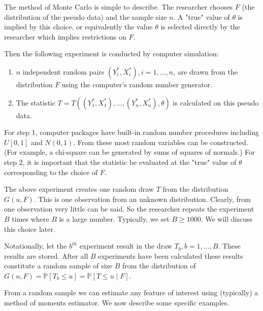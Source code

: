 \documentclass[10pt]{article}
\begin{document}
The method of Monte Carlo is simple to describe. The researcher chooses $F$ (the distribution of the pseudo data) and the sample size $n$. A "true" value of $\theta$ is implied by this choice, or equivalently the value $\theta$ is selected directly by the researcher which implies restrictions on $F$.

Then the following experiment is conducted by computer simulation:

\begin{enumerate}
  \item $n$ independent random pairs $\left(Y_{i}^{*}, X_{i}^{*}\right), i=1, \ldots, n$, are drawn from the distribution $F$ using the computer's random number generator.

  \item The statistic $T=T\left(\left(Y_{1}^{*}, X_{1}^{*}\right), \ldots,\left(Y_{n}^{*}, X_{n}^{*}\right), \theta\right)$ is calculated on this pseudo data.

\end{enumerate}
For step 1, computer packages have built-in random number procedures including $U[0,1]$ and $N(0,1)$. From these most random variables can be constructed. (For example, a chi-square can be generated by sums of squares of normals.) For step 2, it is important that the statistic be evaluated at the "true" value of $\theta$ corresponding to the choice of $F$.

The above experiment creates one random draw $T$ from the distribution $G(u, F)$. This is one observation from an unknown distribution. Clearly, from one observation very little can be said. So the researcher repeats the experiment $B$ times where $B$ is a large number. Typically, we set $B \geq 1000$. We will discuss this choice later.

Notationally, let the $b^{t h}$ experiment result in the draw $T_{b}, b=1, \ldots, B$. These results are stored. After all $B$ experiments have been calculated these results constitute a random sample of size $B$ from the distribution of $G(u, F)=\mathbb{P}\left[T_{b} \leq u\right]=\mathbb{P}[T \leq u \mid F]$.

From a random sample we can estimate any feature of interest using (typically) a method of moments estimator. We now describe some specific examples.
\end{document}
